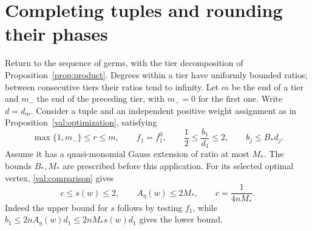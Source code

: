 \section{Completing tuples and rounding their phases}
\label{sec:rounding}

Return to the sequence of germs, with the tier decomposition of
Proposition~\ref{prop:product}. Degrees within a tier have uniformly
bounded ratios; between consecutive tiers their ratios tend to
infinity. Let $m$ be the end of a tier and $m_-$ the end of the
preceding tier, with $m_-=0$ for the first one. Write $d=d_m$.
Consider a tuple and an independent positive weight assignment as
in Proposition~\ref{val:optimization}, satisfying
\begin{equation}\label{round:input-bounds}
 \max\{1,m_-\}\le r\le m,\qquad
 f_1=f_1^0,\qquad \frac12\le\frac{b_1}{d_1}\le2,
 \qquad b_j\le B_*d_j.
\end{equation}
Assume it has a quasi-monomial Gauss extension of ratio at most
$M_*$. The bounds $B_*,M_*$ are prescribed before this application.
For its selected optimal vertex, \eqref{val:comparison} gives
\begin{equation}\label{round:s-bounds}
 c\le s(w)\le2,\qquad A_\eta(w)\le2M_*,\qquad
 c=\frac1{4nM_*}.
\end{equation}
Indeed the upper bound for $s$ follows by testing $f_1$, while
$b_1\le2nA_\eta(w)d_1\le2nM_*s(w)d_1$ gives the lower bound.

